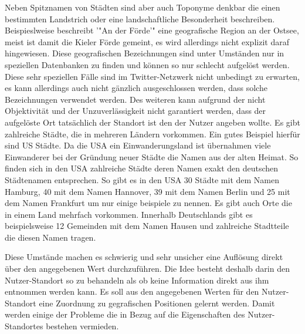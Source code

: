 			Neben Spitznamen von Städten sind aber auch Toponyme denkbar die einen bestimmten Landstrich oder eine landschaftliche Besonderheit beschreiben.
			Beispieslweise beschreibt '"An der Förde'" eine geografische Region an der Ostsee, meist ist damit die Kieler Förde gemeint, es wird allerdings nicht explizit daraf hingewiesen. 
			Diese geografischen Bezeichnungen sind unter Umständen nur in speziellen Datenbanken zu finden und können so nur schlecht aufgelöst werden. 
			Diese sehr speziellen Fälle sind im Twitter-Netzwerk nicht unbedingt zu erwarten, es kann allerdings auch nicht gänzlich ausgeschlossen werden, dass solche Bezeichnungen verwendet werden. 
			Des weiteren kann aufgrund der nicht Objektivität und der Unzuverlässigkeit nicht garantiert werden, dass der aufgelöste Ort tatsächlich der Standort ist den der Nutzer angeben wollte. 
			Es gibt zahlreiche Städte, die in mehreren Ländern vorkommen.
			Ein gutes Beispiel hierfür sind US Städte. 
			Da die USA ein Einwanderungsland ist übernahmen viele Einwanderer bei der Gründung neuer Städte die Namen aus der alten Heimat. 
			So finden sich in den USA zahlreiche Städte deren Namen exakt den deutschen Städtenamen entsprechen. 
			So gibt es in den USA 30 Städte mit dem Namen Hamburg, 40 mit dem Namen Hannover, 39 mit dem Namen Berlin und 25 mit dem Namen Frankfurt um nur einige beispiele zu nennen.
			Es gibt auch Orte die in einem Land mehrfach vorkommen.
			Innerhalb Deutschlands gibt es beispielsweise 12 Gemeinden mit dem Namen Hausen und zahlreiche Stadtteile die diesen Namen tragen.  

			Diese Umstände machen es schwierig und sehr unsicher eine Auflösung direkt über den angegebenen Wert durchzuführen.
			Die Idee besteht deshalb darin den Nutzer-Standort so zu behandeln als ob keine Information direkt aus ihm entnommen werden kann.
			Es soll aus den angegebenen Werten für den Nutzer-Standort eine Zuordnung zu gegrafischen Positionen gelernt werden. 
			Damit werden einige der Probleme die in Bezug auf die Eigenschaften des Nutzer-Standortes bestehen vermieden. 



			



